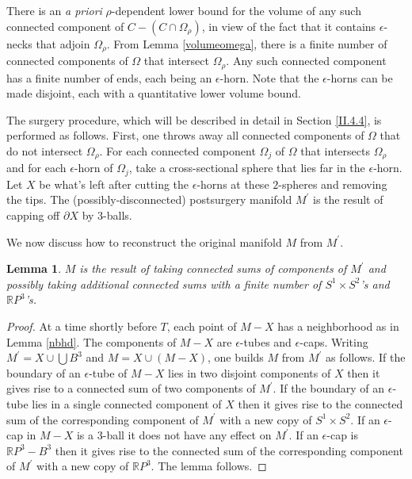 \documentclass[12pt]{amsart}
\newcommand{\R}{{\mathbb R}}
\numberwithin{equation}{section}
\theoremstyle{plain}
\newtheorem{lemma}[equation]{Lemma}
\theoremstyle{definition}
\theoremstyle{remark}
\begin{document}
There is an {\it a priori} $\rho$-dependent lower bound for the volume of any such
connected component of $C - (C \cap \Omega_\rho)$, in view of the fact that
it contains $\epsilon$-necks that adjoin $\Omega_\rho$.
From Lemma \ref{volumeomega},
there is a finite number of connected components of $\Omega$ that
intersect $\Omega_\rho$. Any such connected component has a finite
number of ends, each being an $\epsilon$-horn. Note that the
$\epsilon$-horns can be made disjoint, each with a quantitative lower
volume bound.

The surgery procedure, which will be described in detail in Section 
\ref{II.4.4}, is performed as follows.  First, one throws away all
connected components of $\Omega$ that do not intersect $\Omega_\rho$.
For each connected component $\Omega_j$ of $\Omega$ that intersects
$\Omega_\rho$ and for each $\epsilon$-horn of $\Omega_j$, take
a cross-sectional sphere that lies far in the $\epsilon$-horn.
Let $X$ be what's left after cutting the $\epsilon$-horns 
at these $2$-spheres and removing the tips. The 
(possibly-disconnected) postsurgery manifold $M^\prime$ is the 
result of capping off $\partial X$ by $3$-balls. 

We now discuss how to reconstruct the original manifold
$M$ from $M^\prime$.

\begin{lemma} \label{reconstruct}
$M$ is the result of taking connected sums of components of $M^\prime$ 
and possibly taking additional connected sums with a finite number of
$S^1 \times S^2$'s and $\R P^3$'s.
\end{lemma}
\begin{proof}

At a time shortly before $T$,
each point of $M - X$ has a neighborhood as in Lemma
\ref{nbhd}. The components of $M-X$ are $\epsilon$-tubes and
$\epsilon$-caps.  Writing $M^\prime = X \cup \bigcup B^3$ and
$M = X \cup (M-X)$, one builds $M$ from
$M^\prime$ as follows. 
If the boundary of an $\epsilon$-tube of $M-X$ lies in 
two disjoint components of $X$ then it gives rise to
a connected sum of two components of $M^\prime$.  If the
boundary of an $\epsilon$-tube lies in a single connected 
component of $X$ then it gives rise to the 
connected sum of the corresponding component of $M^\prime$ 
with a new copy of $S^1 \times S^2$.
If an $\epsilon$-cap 
in $M-X$
is a $3$-ball it does not have any effect
on $M^\prime$. If
an $\epsilon$-cap is $\R P^3 - B^3$ then it gives rise to the
connected sum of the corresponding component of $M^\prime$ 
with a new copy of $\R P^3$. The lemma follows.
\end{proof}
\end{document}
